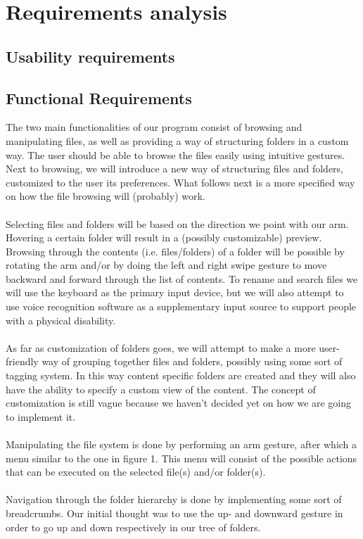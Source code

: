 \documentclass{article}
\begin{document}
\section{Requirements analysis}

\subsection{Usability requirements}

\subsection{Functional Requirements}
The two main functionalities of our program consist of browsing and manipulating files, as well as providing a way of structuring folders in a custom way. The user should be able to browse the files easily using intuitive gestures. Next to browsing, we will introduce a new way of structuring files and folders, customized to the user its preferences. What follows next is a more specified way on how the file browsing will (probably) work. 
\\\\
Selecting files and folders will be based on the direction we point with our arm. Hovering a certain folder will result in a (possibly customizable) preview. Browsing through the contents (i.e. files/folders) of a folder will be possible by rotating the arm and/or by doing the left and right swipe gesture to move backward and forward through the list of contents. To rename and search files we will use the keyboard as the primary input device, but we will also attempt to use voice recognition software as a supplementary input source to support people with a physical disability.
\\\\
As far as customization of folders goes, we will attempt to make a more user-friendly way of grouping together files and folders, possibly using some sort of tagging system. In this way content specific folders are created and they will also have the ability to specify a custom view of the content. The concept of customization is still vague because we haven't decided yet on how we are going to implement it.
\\\\
Manipulating the file system is done by performing an arm gesture, after which a menu similar to the one in figure 1. This menu will consist of the possible actions that can be executed on the selected file(s) and/or folder(s).
\\\\
Navigation through the folder hierarchy is done by implementing some sort of breadcrumbs. Our initial thought was to use the  up- and downward gesture in order to go up and down respectively in our tree of folders.
\end{document}
